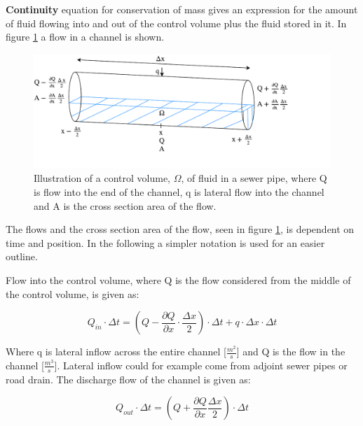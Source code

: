\textbf{Continuity} equation for conservation of mass gives an expression for the amount of fluid flowing into and out of the control volume plus the fluid stored in it. 
In figure \ref{fig:firkant_kloak} a flow in a channel is shown. 

\begin{figure}[H]
\centering
\includegraphics[width=1.1\textwidth]{report/modeling/pictures/continuity_open_channel.pdf}
\caption{Illustration of a control volume, $\Omega$, of fluid in a sewer pipe, where Q is flow into the end of the channel, q is lateral flow into the channel and A is the cross section area of the flow.}
\label{fig:firkant_kloak}
\end{figure}

The flows and the cross section area of the flow, seen in figure \ref{fig:firkant_kloak}, is dependent on time and position. In the following a simpler notation is used for an easier outline. 

Flow into the control volume, where Q is the flow considered from the middle of the control volume, is given as:

\begin{equation}
Q_{in} \cdot \Delta t =	\left(Q - \frac{\partial Q}{\partial x}\cdot \frac{\Delta x}{2}\right) \cdot \Delta t + q \cdot \Delta x \cdot \Delta t
\label{flowin_saintbernard}
\end{equation}

Where q is lateral inflow across the entire channel [$\frac{m^2}{s}$] and Q is the flow in the channel [$\frac{m^3}{s}$]. Lateral inflow could for example come from adjoint sewer pipes or road drain.
The discharge flow of the channel is given as:

\begin{equation}
Q_{out} \cdot \Delta t =\left(Q + \frac{\partial Q}{ \partial x} \frac{\Delta x}{2} \right) \cdot \Delta t 
\label{flowout_saintbernard}
\end{equation}

